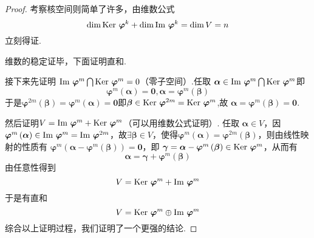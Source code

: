 {\begin{proof}
        考察核空间则简单了许多，由维数公式
        \[
            \dim \operatorname{Ker\,} \bm{\varphi}^k + \dim
            \operatorname{Im\,}\bm{\varphi}^k = \dim V =n
        \]
        立刻得证.

        维数的稳定证毕，下面证明直和.

        接下来先证明
        $\operatorname{Im\,}\bm{\varphi}^m
            \bigcap \operatorname{Ker\,} \bm{\varphi}^m = 0$（零子空间）.任取
        $\bm{\alpha}\in \operatorname{Im\,}\bm{\varphi}^m\bigcap \operatorname{Ker\,} \bm{\varphi}^m$即
        \[
            \bm{\varphi}^m\left(\bm{\alpha}\right)=\bm{0},
            \bm{\alpha}=\bm{\varphi}^m\left(\bm{\beta}\right)
        \]
        于是$\bm{\varphi}^{2m}\left(\bm{\beta}\right)=
            \bm{\varphi}^m\left(\bm{\alpha}\right)=\bm{0}$即$\bm{\beta}\in
            \operatorname{Ker\,} \bm{\varphi}^{2m}=\operatorname{Ker\,} \bm{\varphi}^m$,故
        $\bm{\alpha}=\bm{\varphi}^m\left(\bm{\beta}\right)=\bm{0}$.

        然后证明$V=\operatorname{Im\,}\bm{\varphi}^m + \operatorname{Ker\,} \bm{\varphi}^m$（可以用维数公式证明）.
        任取
        $\bm{\alpha}\in V$，因$\bm{\varphi}^m\left(
            \bm{\alpha}
            \right)\in \operatorname{Im\,}
            \bm{\varphi}^m=\operatorname{Im\,}
            \bm{\varphi}^{2m}$，故$\exists \bm{\beta}\in V$，使得$\bm{\varphi}^{m}\left(\bm{\alpha}
            \right)=\bm{\varphi}^{2m}\left(\bm{\beta}
            \right)$，则由线性映射的性质有
        $\bm{\varphi}^m\left(\bm{\alpha}-\bm{\varphi}^m\left(\bm{\beta}
                \right)\right)=\bm{0}$，即
        $\bm{\gamma}=\bm{\alpha}-\bm{\varphi}^m\left(\bm{\beta}\right)\in \operatorname{Ker\,} \bm{\varphi}^m$，从而有
        \[
            \bm{\alpha}=\bm{\gamma}+\bm{\varphi}^m\left(\bm{\beta}\right)
        \]
        由任意性得到
        \[
            V=\operatorname{Ker\,} \bm{\varphi}^m+\operatorname{Im\,}\bm{\varphi}^m
        \]
        于是有直和
        \[
            V=\operatorname{Ker\,} \bm{\varphi}^m\oplus\operatorname{Im\,}\bm{\varphi}^m
        \]
        综合以上证明过程，我们证明了一个更强的结论.
    \end{proof}
}

